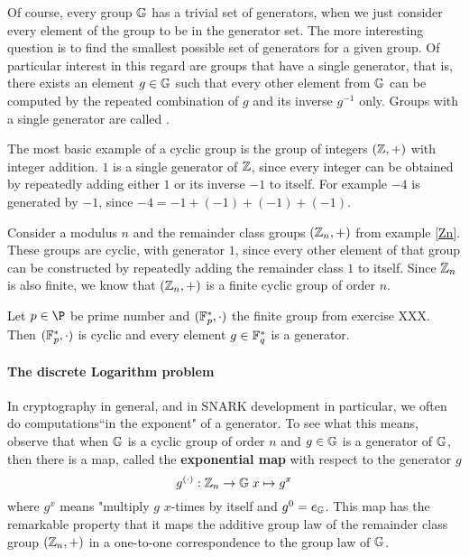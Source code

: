 Of course, every group $\mathbb{G}$ has a trivial set of generators, when we just consider every element of the group to be in the generator set. The more interesting question is to find the smallest possible set of generators for a given group. Of particular interest in this regard are groups that have a single generator, that is, there exists an element $g\in\mathbb{G}$ such that every other element from $\mathbb{G}$ can be computed by the repeated combination of $g$ and its inverse $g^{-1}$ only. Groups with a single generator are called .
\begin{example} The most basic example of a cyclic group is the group of integers $(\mathbb{Z},+)$ with integer addition. $1$ is a single generator of $\mathbb{Z}$, since every integer can be obtained by repeatedly adding either $1$ or its inverse $-1$ to itself. For example
$-4$ is generated by $-1$, since $-4=-1+(-1)+(-1)+(-1)$.
\end{example}
\begin{example} Consider a modulus $n$ and the remainder class groups $(\mathbb{Z}_n,+)$ from example \ref{Zn}. These groups are cyclic, with generator $1$, since every other element of that group can be constructed by repeatedly adding the remainder class $1$ to itself. Since $\mathbb{Z}_n$ is also finite, we know that $(\mathbb{Z}_n,+)$ is a finite cyclic group of order $n$.
\end{example}
\begin{example} Let $p\in\P$ be prime number and $(\mathbb{F}_p^*,\cdot)$ the finite group from exercise XXX. Then $(\mathbb{F}_p^*,\cdot)$ is cyclic and every element $g\in\mathbb{F}_q^*$ is a generator.
\end{example}
\paragraph{The discrete Logarithm problem}
In cryptography in general, and in SNARK development in particular, we often do computations``in the exponent" of a generator. To see what this means, observe that when
$\mathbb{G}$ is a cyclic group of order $n$ and $g\in \mathbb{G}$ is a generator of $\mathbb{G}$, then there is a map, called the \textbf{exponential map} with respect to the generator $g$
\begin{equation}\label{exponentialmap}
g^{(\cdot)}: \mathbb{Z}_n \to \mathbb{G}\; x \mapsto g^x
\end{equation}
where $g^x$ means "multiply $g$ $x$-times by itself and $g^0=e_{\mathbb{G}}$. This map has the remarkable property that it maps the additive group law of the remainder class group $(\mathbb{Z}_n,+)$ in a one-to-one correspondence to the group law of $\mathbb{G}$.

